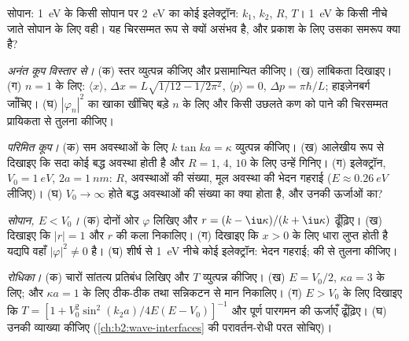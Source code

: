 \begin{exercise}[$\star$]\label{exo:b2:potential-wells-tunneling:4}
सोपान: \qty{1}{eV} के किसी सोपान पर \qty{2}{eV} का कोई इलेक्ट्रॉन: $k_1$, $k_2$,
$R$, $T$। \qty{1}{eV} के किसी नीचे जाते सोपान के लिए वही। यह चिरसम्मत रूप से क्यों
असंभव है, और प्रकाश के लिए उसका समरूप क्या है?
\end{exercise}

\begin{exercise}[$\star\star$]\label{exo:b2:potential-wells-tunneling:5}
\emph{अनंत कूप विस्तार से।} (क) स्तर व्युत्पन्न कीजिए और प्रसामान्यित कीजिए।
(ख) लांबिकता दिखाइए। (ग) $n = 1$ के लिए: $\langle x\rangle$, $\Delta x =
L\sqrt{1/12 - 1/2\pi^2}$, $\langle p\rangle = 0$, $\Delta p = \pi\hbar/L$;
हाइज़ेनबर्ग जाँचिए। (घ) $|\varphi_n|^2$ का खाका खींचिए बड़े $n$ के लिए और किसी उछलते कण को
पाने की चिरसम्मत प्रायिकता से तुलना कीजिए।
\end{exercise}

\begin{exercise}[$\star\star$]\label{exo:b2:potential-wells-tunneling:6}
\emph{परिमित कूप।} (क) सम अवस्थाओं के लिए $k\tan ka = \kappa$ व्युत्पन्न कीजिए।
(ख) आलेखीय रूप से दिखाइए कि सदा कोई बद्ध अवस्था होती है और
$R = 1$, $4$, $10$ के लिए उन्हें गिनिए। (ग) इलेक्ट्रॉन, $V_0 = \qty{1}{eV}$, $2a = \qty{1}{nm}$:
$R$, अवस्थाओं की संख्या, मूल अवस्था की भेदन गहराई
($E \approx \qty{0.26}{eV}$ लीजिए)। (घ) $V_0 \to \infty$ होते बद्ध अवस्थाओं की
संख्या का क्या होता है, और उनकी ऊर्जाओं का?
\end{exercise}

\begin{exercise}[$\star\star$]\label{exo:b2:potential-wells-tunneling:7}
\emph{सोपान, $E < V_0$।} (क) दोनों ओर $\varphi$ लिखिए और $r =
(k - \iu\kappa)/(k + \iu\kappa)$ ढूँढ़िए। (ख) दिखाइए कि $|r| = 1$ और $r$ की कला
निकालिए। (ग) दिखाइए कि $x > 0$ के लिए धारा लुप्त होती है यद्यपि वहाँ $|\varphi|^2 \ne
0$ है। (घ) शीर्ष से \qty{1}{eV} नीचे कोई इलेक्ट्रॉन: भेदन गहराई;
 की  से तुलना कीजिए।
\end{exercise}

\begin{exercise}[$\star\star$]\label{exo:b2:potential-wells-tunneling:8}
\emph{रोधिका।} (क) चारों सांतत्य प्रतिबंध लिखिए और
$T$ व्युत्पन्न कीजिए। (ख) $E =
V_0/2$, $\kappa a = 3$ के लिए; और $\kappa a = 1$ के लिए ठीक-ठीक तथा सन्निकटन से मान निकालिए। (ग) $E > V_0$ के लिए दिखाइए कि $T = [1 +
V_0^2\sin^2(k_2a)/4E(E - V_0)]^{-1}$ और पूर्ण
पारगमन की ऊर्जाएँ ढूँढ़िए। (घ) उनकी व्याख्या कीजिए
(\cref{ch:b2:wave-interfaces} की परावर्तन-रोधी परत सोचिए)।
\end{exercise}

